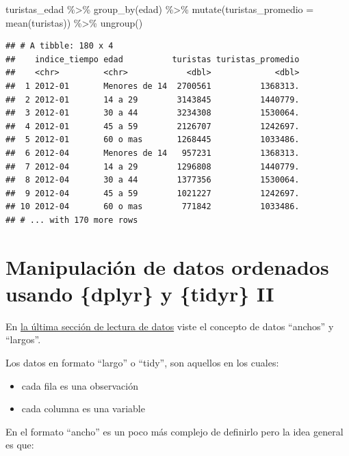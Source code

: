 \documentclass[
  openany]{book}
\newenvironment{Shaded}{\begin{snugshade}}{\end{snugshade}}
\newcommand{\AttributeTok}[1]{\textcolor[rgb]{0.77,0.63,0.00}{#1}}
\newcommand{\FunctionTok}[1]{\textcolor[rgb]{0.00,0.00,0.00}{#1}}
\newcommand{\NormalTok}[1]{#1}
\newcommand{\SpecialCharTok}[1]{\textcolor[rgb]{0.00,0.00,0.00}{#1}}
\providecommand{\tightlist}{%
  \setlength{\itemsep}{0pt}\setlength{\parskip}{0pt}}
\begin{document}
\begin{Shaded}
\begin{Highlighting}[]
\NormalTok{turistas\_edad }\SpecialCharTok{\%\textgreater{}\%} 
  \FunctionTok{group\_by}\NormalTok{(edad) }\SpecialCharTok{\%\textgreater{}\%} 
  \FunctionTok{mutate}\NormalTok{(}\AttributeTok{turistas\_promedio =} \FunctionTok{mean}\NormalTok{(turistas)) }\SpecialCharTok{\%\textgreater{}\%} 
  \FunctionTok{ungroup}\NormalTok{()}
\end{Highlighting}
\end{Shaded}

\begin{verbatim}
## # A tibble: 180 x 4
##    indice_tiempo edad          turistas turistas_promedio
##    <chr>         <chr>            <dbl>             <dbl>
##  1 2012-01       Menores de 14  2700561          1368313.
##  2 2012-01       14 a 29        3143845          1440779.
##  3 2012-01       30 a 44        3234308          1530064.
##  4 2012-01       45 a 59        2126707          1242697.
##  5 2012-01       60 o mas       1268445          1033486.
##  6 2012-04       Menores de 14   957231          1368313.
##  7 2012-04       14 a 29        1296808          1440779.
##  8 2012-04       30 a 44        1377356          1530064.
##  9 2012-04       45 a 59        1021227          1242697.
## 10 2012-04       60 o mas        771842          1033486.
## # ... with 170 more rows
\end{verbatim}

\hypertarget{manipulaciuxf3n-de-datos-ordenados-usando-dplyr-y-tidyr-ii}{%
\chapter{Manipulación de datos ordenados usando \{dplyr\} y \{tidyr\} II}\label{manipulaciuxf3n-de-datos-ordenados-usando-dplyr-y-tidyr-ii}}

En \href{04-lectura-datos.html\#Formatos_de_tablas}{la última sección de lectura de datos} viste el concepto de datos ``anchos'' y ``largos''.

Los datos en formato ``largo'' o ``tidy'', son aquellos en los cuales:

\begin{itemize}
\tightlist
\item
  cada fila es una observación
\item
  cada columna es una variable
\end{itemize}

En el formato ``ancho'' es un poco más complejo de definirlo pero la idea general es que:
\end{document}
